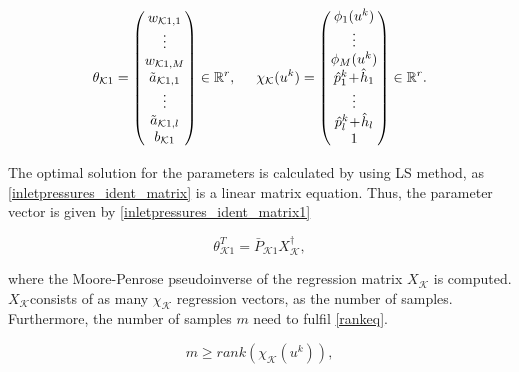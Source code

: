   \begin{equation}
\label{par_regr_matrix}
\theta_{\mathcal{K}1} = 
          \begin{pmatrix}
           w_{\mathcal{K}1,1}  \\
           \vdots  \\
           w_{\mathcal{K}1,M}  \\
           \tilde{a}_{\mathcal{K}1,1} \\
           \vdots \\
           \tilde{a}_{\mathcal{K}1,l} \\
           b_{\mathcal{K}1} \\
         \end{pmatrix} \in  \mathbb{R}^{r},
         \hspace{5mm}
         \chi_{\mathcal{K}}(u^k) = 
         \begin{pmatrix}
           \phi_{1}(u^k)  \\
           \vdots  \\
           \phi_{M}(u^k)  \\
           \hat{p}^k_{1} \!+ \!\hat{h}_{1} \\
           \vdots  \\
           \hat{p}^k_{l} \!+ \!\hat{h}_{l} \\
           1 \\
         \end{pmatrix}\in  \mathbb{R}^{r}.
\end{equation}

The optimal solution for the parameters is calculated by using LS method, as \eqref{inletpressures_ident_matrix} is a linear matrix equation. Thus, the parameter vector is given by \eqref{inletpressures_ident_matrix1}

\begin{equation}
\label{inletpressures_ident_matrix1}
 \theta^T_{\mathcal{K}1} = \bar{P}_{\mathcal{K}1} X_{\mathcal{K}}^{\dagger}, 
\end{equation}

where the Moore-Penrose pseudoinverse of the regression matrix $X_{\mathcal{K}}$ is computed. $X_{\mathcal{K}}$consists of as many $\chi_{\mathcal{K}}$ regression vectors, as the number of samples. Furthermore, the number of samples $m$ need to fulfil \eqref{rankeq}.

\begin{equation}
\label{rankeq}
 m \geq rank(\chi_{\mathcal{K}}(u^k)),
\end{equation}

